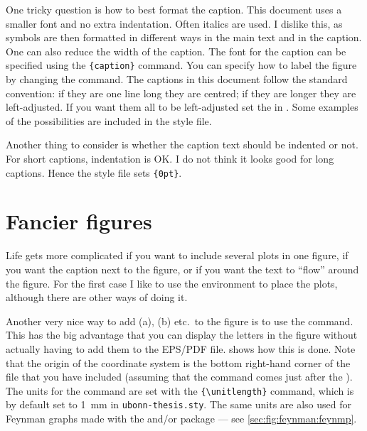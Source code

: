 One tricky question is how to best format the caption. This document
uses a smaller font and no extra indentation. Often italics are
used. I dislike this, as symbols are then formatted in different ways
in the main text and in the caption. One can also reduce the width of
the caption. The font for the caption can be specified using the
\texttt{\{caption\}} command. You can specify how
to label the figure by changing the  command. The
captions in this document follow the standard \KOMAScript{}
convention: if they are one line long they are centred; if they are
longer they are left-adjusted. If you want them all to be
left-adjusted set the 
in . Some examples of the possibilities are
included in the style file.

Another thing to consider is whether the caption text should be indented or
not. For short captions, indentation is OK\@. I do not think it looks
good for long captions. Hence the style file sets
\texttt{\{0pt\}}.

\section{Fancier figures}%
\label{sec:fig:fancy}

Life gets more complicated if you want to include several plots in
one figure, if you want the caption next to the figure, or if you want
the text to \enquote{flow} around the figure. For the first case I like to
use the  environment to place the plots, although
there are other ways of doing it.

Another very nice way to add (a), (b) etc.\ to the figure is to use the
 command. This has the big advantage that you can display
the letters in the figure without actually having to add them to the
EPS/PDF file.  shows how this is done. Note
that the origin of the coordinate system is the bottom right-hand
corner of the file that you have included (assuming that the
 command comes just after the ).
The units for the  command are set with the
\texttt{\{\textbackslash unitlength\}} command, which
is by default set to \qty{1}{\mm} in \texttt{ubonn-thesis.sty}.
The same units are also used for Feynman graphs made with the
 and/or  package --- see
\cref{sec:fig:feynman:feynmp}.

